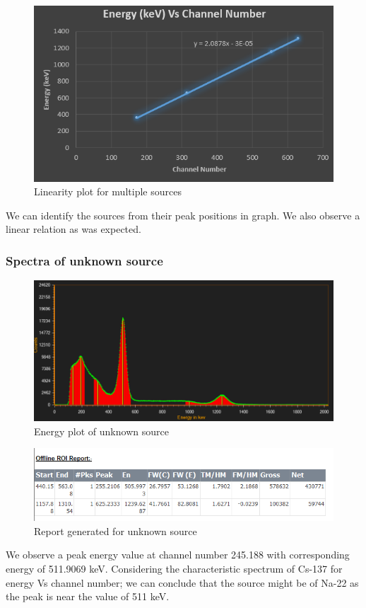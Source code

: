 \documentclass[%
 reprint,
nofootinbib,
 amsmath,amssymb,
 aps,
floatfix,
]{revtex4-2}
\begin{document}
\begin{figure}[H]
    \centering
    \includegraphics[width = 8 cm]{Figures/Screenshot (236).png}
    \caption{Linearity plot for multiple sources}
    \label{fig:my_label}
\end{figure}
We can identify the sources from their peak positions in graph. We also observe a linear relation as was expected.

\subsubsection*{Spectra of unknown source}
\begin{figure}[H]
    \centering
    \includegraphics[width = 8 cm]{Figures/Unknown(Na)_spectrum.PNG}
    \caption{Energy plot of unknown source}
    \label{fig:my_label}
\end{figure}
\begin{figure}
    \centering
    \includegraphics[scale = 0.3]{Figures/Unknown(Na)_report.PNG}
    \caption{Report generated for unknown source}
    \label{fig:my_label}
\end{figure}
We observe a peak energy value at channel number 245.188 with corresponding energy of 511.9069 keV. Considering the characteristic spectrum of Cs-137 for energy Vs channel number; we can conclude that the source might be of Na-22 as the peak is near the value of 511 keV.
\end{document}
